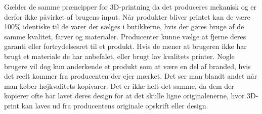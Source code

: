 Gælder de samme præncipper for 3D-printning da det produceres mekanisk og er derfor ikke påvirket af brugens input. Når produkter bliver printet kan de være 100\% identiske til de varer der sælges i butikkerne, hvis der gøres bruge af de samme kvalitet, farver og materialer.
Producenter kunne vælge at fjerne deres garanti eller fortrydelsesret til et produkt. Hvis de mener at brugeren ikke har brugt et materiale de har anbefalet, eller brugt lav kvalitets printer.
Nogle brugere vil dog kun anderkende et produkt som at være en del af branded, hvis det reelt kommer fra producenten der ejer mærket. Det ser man blandt andet når man køber højkvalitets kopivarer.\autocite{_vi_????}
Det er ikke helt det samme, da dem der kopierer ofte har lavet deres design for at det skulle ligne originalenerne, hvor 3D-print kan laves ud fra producentens originale opskrift eller design.